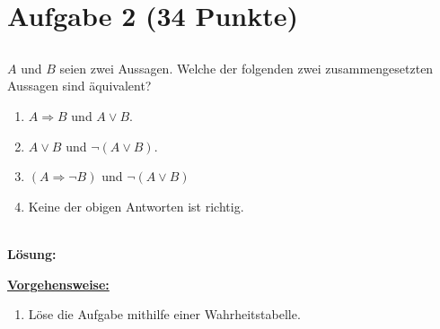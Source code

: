 \section*{Aufgabe 2 (34 Punkte)}
\vspace{0.4cm}
\subsection*{}
$ A $ und $ B $ seien zwei Aussagen. Welche der folgenden zwei zusammengesetzten Aussagen sind äquivalent? 
\renewcommand{\labelenumi}{(\alph{enumi})}
\begin{enumerate}
	\item $ A \Rightarrow  B $ und $A \vee B$.
	\item $ A \vee B $ und $\neg (A \vee B)$.
	\item $ (A \Rightarrow \neg B) $ und $\neg ( A \vee B )$
	\item Keine der obigen Antworten ist richtig.
\end{enumerate}\ \\
\textbf{Lösung:}
\begin{mdframed}
\underline{\textbf{Vorgehensweise:}}
\renewcommand{\labelenumi}{\theenumi.}
\begin{enumerate}
\item Löse die Aufgabe mithilfe einer Wahrheitstabelle.
\end{enumerate}
\end{mdframed}

